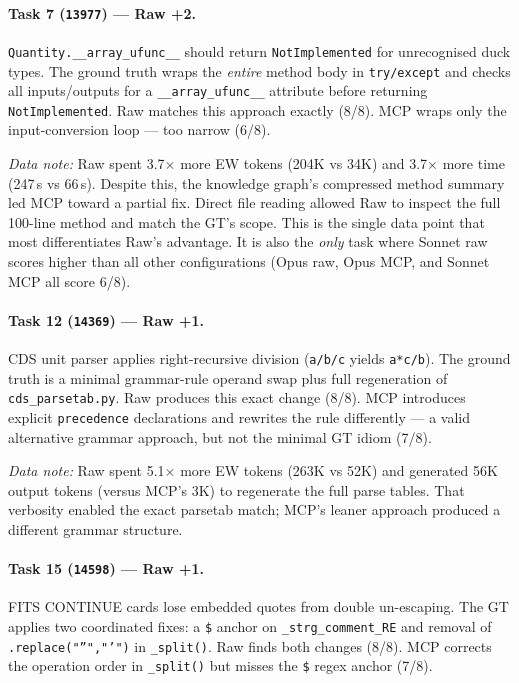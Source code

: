 \paragraph{Task 7 (\texttt{13977}) --- Raw +2.}
\texttt{Quantity.\_\_array\_ufunc\_\_} should return
\texttt{NotImplemented} for unrecognised duck types.
The ground truth wraps the \emph{entire} method body in
\texttt{try/except} and checks all inputs/outputs for a
\texttt{\_\_array\_ufunc\_\_} attribute before returning
\texttt{NotImplemented}.
Raw matches this approach exactly (8/8).
MCP wraps only the input-conversion loop --- too narrow (6/8).

\emph{Data note:} Raw spent 3.7$\times$ more EW tokens (204K vs 34K)
and 3.7$\times$ more time (247\,s vs 66\,s).
Despite this, the knowledge graph's compressed method summary led
MCP toward a partial fix.  Direct file reading allowed Raw to inspect
the full 100-line method and match the GT's scope.
This is the single data point that most differentiates Raw's advantage.
It is also the \emph{only} task where Sonnet raw scores higher than all
other configurations (Opus raw, Opus MCP, and Sonnet MCP all score 6/8).

\paragraph{Task 12 (\texttt{14369}) --- Raw +1.}
CDS unit parser applies right-recursive division (\texttt{a/b/c}
yields \texttt{a*c/b}).
The ground truth is a minimal grammar-rule operand swap plus full
regeneration of \texttt{cds\_parsetab.py}.
Raw produces this exact change (8/8).
MCP introduces explicit \texttt{precedence} declarations and
rewrites the rule differently --- a valid alternative grammar approach,
but not the minimal GT idiom (7/8).

\emph{Data note:} Raw spent 5.1$\times$ more EW tokens (263K vs 52K)
and generated 56K output tokens (versus MCP's 3K) to regenerate the
full parse tables.  That verbosity enabled the exact parsetab match;
MCP's leaner approach produced a different grammar structure.

\paragraph{Task 15 (\texttt{14598}) --- Raw +1.}
FITS CONTINUE cards lose embedded quotes from double un-escaping.
The GT applies two coordinated fixes: a \texttt{\$} anchor on
\texttt{\_strg\_comment\_RE} and removal of
\texttt{.replace("''","'")} in \texttt{\_split()}.
Raw finds both changes (8/8).
MCP corrects the operation order in \texttt{\_split()} but misses the
\texttt{\$} regex anchor (7/8).

